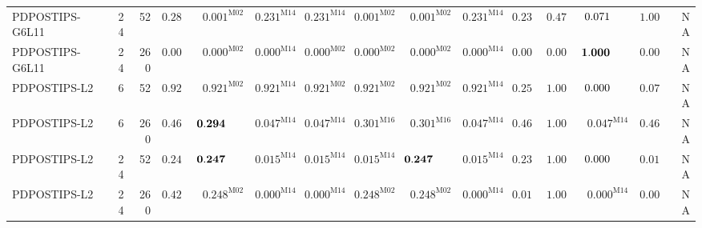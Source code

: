 \documentclass[10pt,a4paper]{article}
\begin{document}
\begin{longtable}{@{}lrrrrrrrrrrrrrr@{}}
PDPOSTIPS-G6L11 & 24 & 52 & $\mathbf{0.280}$ & $0.001^{\mathrm{M02}}$ & $\mathbf{0.231}^{\mathrm{M14}}$ & $\mathbf{0.231}^{\mathrm{M14}}$ & $0.001^{\mathrm{M02}}$ & $0.001^{\mathrm{M02}}$ & $\mathbf{0.231}^{\mathrm{M14}}$ & $\mathbf{0.231}$ & $\mathbf{0.477}$ & $0.071\hphantom{^{\mathrm{M00}}}$ & $\mathbf{1.000}$ & \textsc{NA} \\
PDPOSTIPS-G6L11 & 24 & 260 & $0.000$ & $0.000^{\mathrm{M02}}$ & $0.000^{\mathrm{M14}}$ & $0.000^{\mathrm{M02}}$ & $0.000^{\mathrm{M02}}$ & $0.000^{\mathrm{M02}}$ & $0.000^{\mathrm{M14}}$ & $0.000$ & $0.000$ & $\mathbf{1.000}\hphantom{^{\mathrm{M00}}}$ & $0.000$ & \textsc{NA} \\
PDPOSTIPS-L2 & 6 & 52 & $\mathbf{0.921}$ & $\mathbf{0.921}^{\mathrm{M02}}$ & $\mathbf{0.921}^{\mathrm{M14}}$ & $\mathbf{0.921}^{\mathrm{M02}}$ & $\mathbf{0.921}^{\mathrm{M02}}$ & $\mathbf{0.921}^{\mathrm{M02}}$ & $\mathbf{0.921}^{\mathrm{M14}}$ & $\mathbf{0.258}$ & $\mathbf{1.000}$ & $0.000\hphantom{^{\mathrm{M00}}}$ & $0.075$ & \textsc{NA} \\
PDPOSTIPS-L2 & 6 & 260 & $\mathbf{0.460}$ & $\mathbf{0.294}\hphantom{^{\mathrm{M00}}}$ & $0.047^{\mathrm{M14}}$ & $0.047^{\mathrm{M14}}$ & $\mathbf{0.301}^{\mathrm{M16}}$ & $\mathbf{0.301}^{\mathrm{M16}}$ & $0.047^{\mathrm{M14}}$ & $\mathbf{0.460}$ & $\mathbf{1.000}$ & $0.047^{\mathrm{M14}}$ & $\mathbf{0.460}$ & \textsc{NA} \\
PDPOSTIPS-L2 & 24 & 52 & $\mathbf{0.247}$ & $\mathbf{0.247}\hphantom{^{\mathrm{M00}}}$ & $0.015^{\mathrm{M14}}$ & $0.015^{\mathrm{M14}}$ & $0.015^{\mathrm{M14}}$ & $\mathbf{0.247}\hphantom{^{\mathrm{M00}}}$ & $0.015^{\mathrm{M14}}$ & $\mathbf{0.230}$ & $\mathbf{1.000}$ & $0.000\hphantom{^{\mathrm{M00}}}$ & $0.015$ & \textsc{NA} \\
PDPOSTIPS-L2 & 24 & 260 & $\mathbf{0.427}$ & $\mathbf{0.248}^{\mathrm{M02}}$ & $0.000^{\mathrm{M14}}$ & $0.000^{\mathrm{M14}}$ & $\mathbf{0.248}^{\mathrm{M02}}$ & $\mathbf{0.248}^{\mathrm{M02}}$ & $0.000^{\mathrm{M14}}$ & $0.012$ & $\mathbf{1.000}$ & $0.000^{\mathrm{M14}}$ & $0.002$ & \textsc{NA} \\
\end{longtable}
\end{document}
